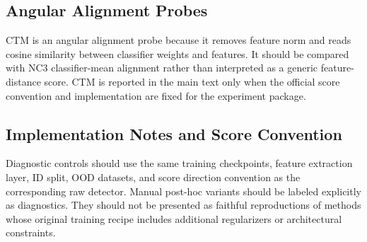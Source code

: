 \subsection{Angular Alignment Probes}
\label{app:angular-alignment-probes}

CTM is an angular alignment probe because it removes feature norm and reads
cosine similarity between classifier weights and features. It should be compared
with NC3 classifier-mean alignment rather than interpreted as a generic
feature-distance score. CTM is reported in the main text only when the official
score convention and implementation are fixed for the experiment package.

\subsection{Implementation Notes and Score Convention}
\label{app:diagnostic-implementation-notes}

Diagnostic controls should use the same training checkpoints, feature extraction
layer, ID split, OOD datasets, and score direction convention as the corresponding
raw detector. Manual post-hoc variants should be labeled explicitly as
diagnostics. They should not be presented as faithful reproductions of methods
whose original training recipe includes additional regularizers or architectural
constraints.
